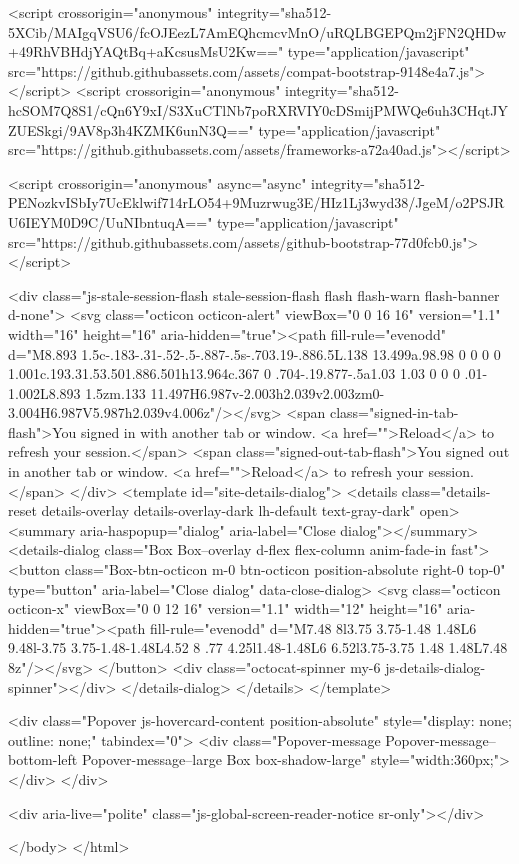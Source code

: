     <script crossorigin="anonymous" integrity="sha512-5XCib/MAIgqVSU6/fcOJEezL7AmEQhcmcvMnO/uRQLBGEPQm2jFN2QHDw+49RhVBHdjYAQtBq+aKcsusMsU2Kw==" type="application/javascript" src="https://github.githubassets.com/assets/compat-bootstrap-9148e4a7.js"></script>
    <script crossorigin="anonymous" integrity="sha512-hcSOM7Q8S1/cQn6Y9xI/S3XuCTlNb7poRXRVIY0cDSmijPMWQe6uh3CHqtJYZUESkgi/9AV8p3h4KZMK6unN3Q==" type="application/javascript" src="https://github.githubassets.com/assets/frameworks-a72a40ad.js"></script>
    
    <script crossorigin="anonymous" async="async" integrity="sha512-PENozkvISbIy7UcEklwif714rLO54+9Muzrwug3E/HIz1Lj3wyd38/JgeM/o2PSJRU6IEYM0D9C/UuNIbntuqA==" type="application/javascript" src="https://github.githubassets.com/assets/github-bootstrap-77d0fcb0.js"></script>
    
    
    
  <div class="js-stale-session-flash stale-session-flash flash flash-warn flash-banner d-none">
    <svg class="octicon octicon-alert" viewBox="0 0 16 16" version="1.1" width="16" height="16" aria-hidden="true"><path fill-rule="evenodd" d="M8.893 1.5c-.183-.31-.52-.5-.887-.5s-.703.19-.886.5L.138 13.499a.98.98 0 0 0 0 1.001c.193.31.53.501.886.501h13.964c.367 0 .704-.19.877-.5a1.03 1.03 0 0 0 .01-1.002L8.893 1.5zm.133 11.497H6.987v-2.003h2.039v2.003zm0-3.004H6.987V5.987h2.039v4.006z"/></svg>
    <span class="signed-in-tab-flash">You signed in with another tab or window. <a href="">Reload</a> to refresh your session.</span>
    <span class="signed-out-tab-flash">You signed out in another tab or window. <a href="">Reload</a> to refresh your session.</span>
  </div>
  <template id="site-details-dialog">
  <details class="details-reset details-overlay details-overlay-dark lh-default text-gray-dark" open>
    <summary aria-haspopup="dialog" aria-label="Close dialog"></summary>
    <details-dialog class="Box Box--overlay d-flex flex-column anim-fade-in fast">
      <button class="Box-btn-octicon m-0 btn-octicon position-absolute right-0 top-0" type="button" aria-label="Close dialog" data-close-dialog>
        <svg class="octicon octicon-x" viewBox="0 0 12 16" version="1.1" width="12" height="16" aria-hidden="true"><path fill-rule="evenodd" d="M7.48 8l3.75 3.75-1.48 1.48L6 9.48l-3.75 3.75-1.48-1.48L4.52 8 .77 4.25l1.48-1.48L6 6.52l3.75-3.75 1.48 1.48L7.48 8z"/></svg>
      </button>
      <div class="octocat-spinner my-6 js-details-dialog-spinner"></div>
    </details-dialog>
  </details>
</template>

  <div class="Popover js-hovercard-content position-absolute" style="display: none; outline: none;" tabindex="0">
  <div class="Popover-message Popover-message--bottom-left Popover-message--large Box box-shadow-large" style="width:360px;">
  </div>
</div>

  <div aria-live="polite" class="js-global-screen-reader-notice sr-only"></div>

  </body>
</html>

